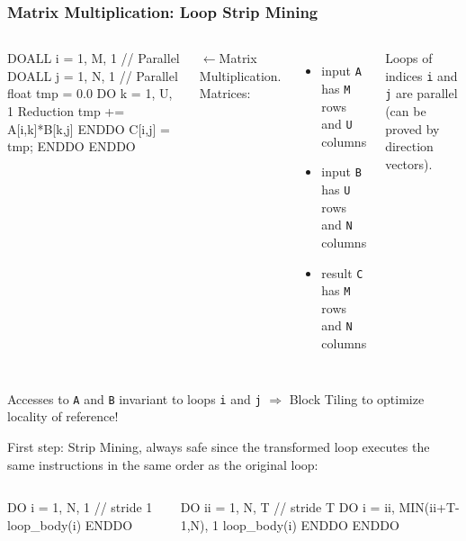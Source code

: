 \documentclass{beamer}
\renewcommand{\emph}[1]{\textcolor{structure}{#1}}
\newcommand{\emp}[1]{\textcolor{DikuRed}{ #1}}
\newcommand{\emphh}[1]{\textcolor{CosGreen}{ #1}}
\begin{document}
\begin{frame}[fragile,t]
  \frametitle{Matrix Multiplication: Loop Strip Mining} %

\begin{columns}
\begin{colorcode}[fontsize=\scriptsize]
DOALL i = 1, M, 1    \emphh{// Parallel}
  DOALL j = 1, N, 1  \emphh{// Parallel}
    float tmp = 0.0
    DO k = 1, U, 1 \emp{Reduction}
      tmp += A[i,k]*B[k,j] 
    ENDDO                  
    C[i,j] = tmp;          
  ENDDO
ENDDO
\end{colorcode}
$\leftarrow$Matrix Multiplication. Matrices:\smallskip
\begin{itemize}
    \item input {\tt A} has {\tt M} rows and {\tt U} columns
    \item input {\tt B} has {\tt U} rows and {\tt N} columns
    \item result {\tt C} has {\tt M} rows and {\tt N} columns 
\end{itemize}

Loops of indices {\tt i} and {\tt j} are parallel
(can be proved by direction vectors).
\end{columns}
\medskip

\emph{Accesses to {\tt A} and {\tt B} invariant to loops {\tt i} and {\tt j} $\Rightarrow$ Block Tiling to optimize locality of reference!}  
\bigskip

First step: Strip Mining, always safe since 
the transformed loop executes the same instructions in the same 
order as the original loop:\medskip

\begin{columns}
\begin{colorcode}[fontsize=\scriptsize]
DO i = 1, N, 1  \alert{// stride 1}
  loop_body(i)
ENDDO


\end{colorcode}
\begin{colorcode}[fontsize=\scriptsize]
DO ii = 1, N, T        \alert{// stride T}
  DO i = ii, MIN(ii+T-1,N), 1 
    loop_body(i)
  ENDDO
ENDDO
\end{colorcode}
\end{columns}
\end{frame}
\end{document}
